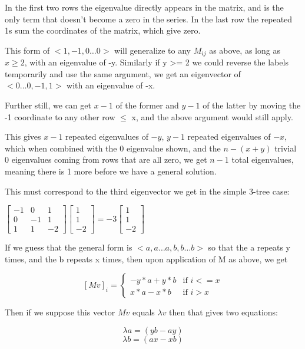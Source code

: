 \documentclass{article}
\begin{document}
In the first two rows the eigenvalue directly appears in the matrix, and is the
only term that doesn't become a zero in the series.
In the last row the repeated 1s sum the coordinates of the matrix, which give
zero.

This form of $<1, -1, 0\ldots 0>$ will generalize to any $M_{ij}$ as above, as
long as $x \geq 2$, with an eigenvalue of -y.
Similarly if y >= 2 we could reverse the labels temporarily and use the same
argument, we get an eigenvector of $<0\ldots 0, -1, 1>$ with an eigenvalue of
-x.

Further still, we can get $x-1$ of the former and $y-1$ of the latter by moving
the -1 coordinate to any other row $\leq$ x, and the above argument would still
apply.

This gives $x-1$ repeated eigenvalues of $-y$, $y-1$ repeated eigenvalues of
$-x$, which when combined with the 0 eigenvalue shown, and the $n - (x + y)$
trivial $0$ eigenvalues coming from rows that are all zero, we get $n-1$ total
eigenvalues, meaning there is 1 more before we have a general solution.

This must correspond to the third eigenvector we get in the simple 3-tree case:

$
\left[\begin{matrix}
	-1 & 0 & 1\\
	0 & -1 & 1\\
	1 & 1 & -2
\end{matrix}\right]
\left[\begin{matrix}
	1\\
	1\\
	-2
\end{matrix}\right]
=
-3
\left[\begin{matrix}
	1\\
	1\\
	-2
\end{matrix}\right]
$

If we guess that the general form is $<a, a\ldots a, b, b\ldots b>$ so that the
a repeats y times, and the b repeats x times, then upon application of M as
above, we get

\[ {[Mv]}_i = \begin{cases}
	-y*a + y*b & \text{if } i <= x\\
	x*a - x*b & \text{if } i > x
\end{cases} \]

Then if we suppose this vector $Mv$ equals $\lambda v$ then that gives two
equations:

\begin{equation}
	\lambda a = (yb - ay)
\end{equation}
\begin{equation*}
	\lambda b = (ax - xb)
\end{equation*}
\end{document}
